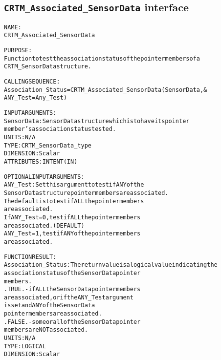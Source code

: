 \subsection{\texttt{CRTM\_Associated\_SensorData} interface}
  \label{sec:CRTM_Associated_SensorData_interface}
  \begin{alltt}
 
  NAME:
        CRTM_Associated_SensorData
 
  PURPOSE:
        Function to test the association status of the pointer members of a
        CRTM_SensorData structure.
 
  CALLING SEQUENCE:
        Association_Status = CRTM_Associated_SensorData( SensorData       , &
                                                         ANY_Test=Any_Test  )
 
  INPUT ARGUMENTS:
        SensorData:  SensorData structure which is to have its pointer
                     member's association status tested.
                     UNITS:      N/A
                     TYPE:       CRTM_SensorData_type
                     DIMENSION:  Scalar
                     ATTRIBUTES: INTENT(IN)
 
  OPTIONAL INPUT ARGUMENTS:
        ANY_Test:    Set this argument to test if ANY of the
                     SensorData structure pointer members are associated.
                     The default is to test if ALL the pointer members
                     are associated.
                     If ANY_Test = 0, test if ALL the pointer members
                                      are associated.  (DEFAULT)
                        ANY_Test = 1, test if ANY of the pointer members
                                      are associated.
 
  FUNCTION RESULT:
        Association_Status:  The return value is a logical value indicating the
                             association status of the SensorData pointer
                             members.
                             .TRUE.  - if ALL the SensorData pointer members
                                       are associated, or if the ANY_Test argument
                                       is set and ANY of the SensorData
                                       pointer members are associated.
                             .FALSE. - some or all of the SensorData pointer
                                       members are NOT associated.
                             UNITS:      N/A
                             TYPE:       LOGICAL
                             DIMENSION:  Scalar
 
  \end{alltt}
